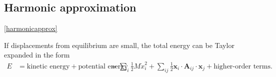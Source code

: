 





\subsection{Harmonic approximation} \ref{harmonicapprox}

If displacements from equilibrium are small, the total energy can be Taylor expanded in the form 
\begin{align} \label{taylorexpansion}
E&=\textrm{kinetic energy}+\textrm{potential energy}
&=\sum_i\frac{1}{2}M\dot{x}_i^2+\sum_{ij}\frac{1}{2}\textbf{x}_i\cdot\textbf{A}_{ij}\cdot\textbf{x}_j+\textrm{higher-order terms}.
\end{align}

